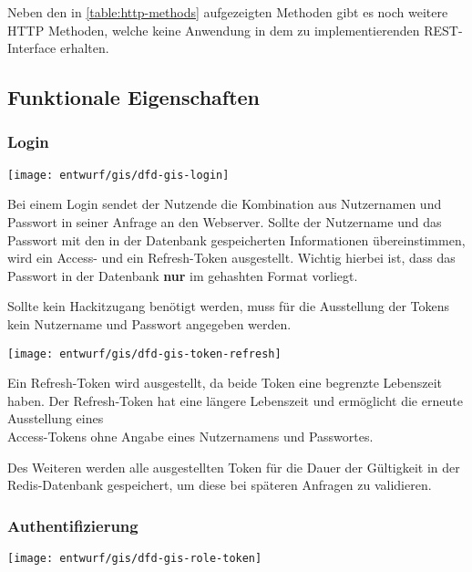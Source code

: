Neben den in \autoref{table:http-methods} aufgezeigten Methoden gibt es noch weitere HTTP Methoden, welche keine Anwendung in dem zu implementierenden REST-Interface erhalten.

\subsection{Funktionale Eigenschaften}
\subsubsection{Login}\label{subsub:login}
\begin{center}
	\texttt{[image: entwurf/gis/dfd-gis-login]}
\end{center}

Bei einem Login sendet der Nutzende die Kombination aus Nutzernamen und Passwort in seiner Anfrage an den Webserver. Sollte der Nutzername und das Passwort mit den in der Datenbank gespeicherten Informationen übereinstimmen, wird ein Access- und ein Refresh-Token ausgestellt. Wichtig hierbei ist, dass das Passwort in der Datenbank \textbf{nur} im gehashten Format vorliegt.

Sollte kein Hackitzugang benötigt werden, muss für die Ausstellung der Tokens kein Nutzername und Passwort angegeben werden.

\begin{center}
	\texttt{[image: entwurf/gis/dfd-gis-token-refresh]}
\end{center}

Ein Refresh-Token wird ausgestellt, da beide Token eine begrenzte Lebenszeit haben. Der Refresh-Token hat eine längere Lebenszeit und ermöglicht die erneute Ausstellung eines \\ Access-Tokens ohne Angabe eines Nutzernamens und Passwortes.

Des Weiteren werden alle ausgestellten Token für die Dauer der Gültigkeit in der Redis-Datenbank gespeichert, um diese bei späteren Anfragen zu validieren. 

\subsubsection{Authentifizierung}
\begin{center}
	\texttt{[image: entwurf/gis/dfd-gis-role-token]}
\end{center}

